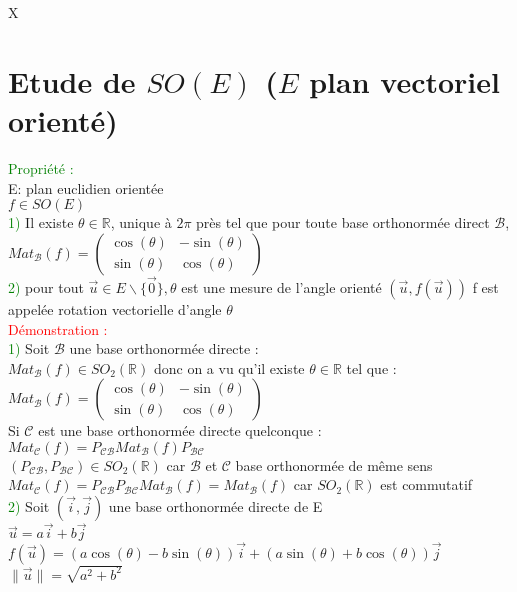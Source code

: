 X\documentclass{article}
\begin{document}
\section{Etude de $SO(E)$ ($E$ plan vectoriel orienté)}
\textcolor{green}{Propriété :} \\
E: plan euclidien orientée \\
$f \in SO(E)$ \\
\textcolor{green}{1)} Il existe $\theta \in \mathbb R$, unique à $2\pi$ près tel que pour toute base orthonormée direct $\mathcal B$, $Mat_{\mathcal B}(f) = \begin{pmatrix}
\cos(\theta) & -\sin(\theta) \\
\sin(\theta) & \cos(\theta)
\end{pmatrix}$ \\
\textcolor{green}{2)} pour tout $\vec u \in E \backslash \lbrace \vec 0 \rbrace, \theta$ est une mesure de l'angle orienté $(\vec u, f(\vec u))$ f est appelée rotation vectorielle d'angle $\theta$ \\
\textcolor{red}{Démonstration :} \\
\textcolor{green}{1)} Soit $\mathcal B$ une base orthonormée directe : \\
$Mat_{\mathcal B}(f) \in SO_2(\mathbb R)$ donc on a vu qu'il existe $\theta \in \mathbb R$ tel que : \\
$Mat_{\mathcal B}(f)= \begin{pmatrix}
\cos(\theta) & - \sin(\theta) \\
\sin(\theta) & \cos(\theta)
\end{pmatrix}$ \\
Si $\mathcal C$ est une base orthonormée directe quelconque : \\
$Mat_{\mathcal C}(f)=P_{\mathcal{CB}} Mat_{\mathcal B}(f) P_{\mathcal{BC}}$ \\
$(P_{\mathcal{CB}},P_{\mathcal{BC}}) \in SO_2(\mathbb R)$ car $\mathcal B$ et $\mathcal C$ base orthonormée de même sens \\
$Mat_{\mathcal C}(f)=P_{\mathcal{CB}} P_{\mathcal{BC}} Mat_{\mathcal B}(f)=Mat_{\mathcal B}(f)$ car $SO_2(\mathbb R)$ est commutatif \\
\textcolor{green}{2)} Soit $(\vec i,\vec j)$ une base orthonormée directe de E \\
$\vec u=a \vec i + b\vec j$ \\
$f(\vec u)=(a\cos(\theta)-b \sin(\theta))\vec i + (a\sin(\theta)+b\cos(\theta))\vec j$ \\
$\| \vec u \| = \sqrt{a^2+b^2}$ \\
\end{document}
